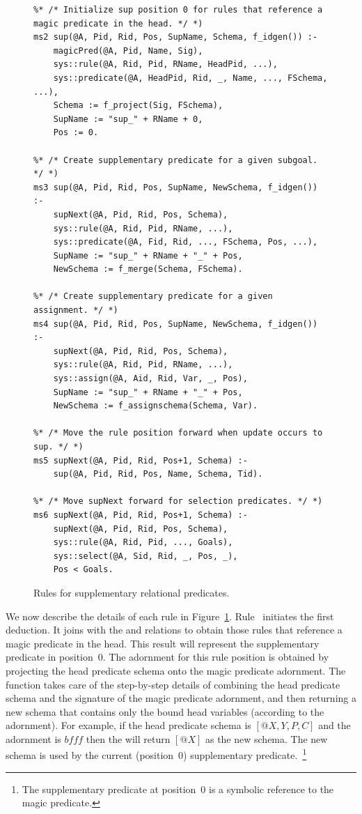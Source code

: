 \begin{figure}[!t]
\ssp
\centering
\begin{lstlisting}
%* /* Initialize sup position 0 for rules that reference a magic predicate in the head. */ *)
ms2 sup(@A, Pid, Rid, Pos, SupName, Schema, f_idgen()) :-
    magicPred(@A, Pid, Name, Sig),
    sys::rule(@A, Rid, Pid, RName, HeadPid, ...),
    sys::predicate(@A, HeadPid, Rid, _, Name, ..., FSchema, ...),
    Schema := f_project(Sig, FSchema),
    SupName := "sup_" + RName + 0,
    Pos := 0.

%* /* Create supplementary predicate for a given subgoal. */ *)
ms3 sup(@A, Pid, Rid, Pos, SupName, NewSchema, f_idgen()) :-
    supNext(@A, Pid, Rid, Pos, Schema),
    sys::rule(@A, Rid, Pid, RName, ...),
    sys::predicate(@A, Fid, Rid, ..., FSchema, Pos, ...),
    SupName := "sup_" + RName + "_" + Pos,
    NewSchema := f_merge(Schema, FSchema).
	
%* /* Create supplementary predicate for a given assignment. */ *)
ms4 sup(@A, Pid, Rid, Pos, SupName, NewSchema, f_idgen()) :-
    supNext(@A, Pid, Rid, Pos, Schema), 
    sys::rule(@A, Rid, Pid, RName, ...),
    sys::assign(@A, Aid, Rid, Var, _, Pos),
    SupName := "sup_" + RName + "_" + Pos,
    NewSchema := f_assignschema(Schema, Var).

%* /* Move the rule position forward when update occurs to sup. */ *)
ms5 supNext(@A, Pid, Rid, Pos+1, Schema) :-
    sup(@A, Pid, Rid, Pos, Name, Schema, Tid).
	
%* /* Move supNext forward for selection predicates. */ *)
ms6 supNext(@A, Pid, Rid, Pos+1, Schema) :-
    supNext(@A, Pid, Rid, Pos, Schema),
    sys::rule(@A, Rid, Pid, ..., Goals),
    sys::select(@A, Sid, Rid, _, Pos, _),
    Pos < Goals. 
\end{lstlisting}
\caption{\label{ch:magic:fig:magic2}Rules for supplementary relational predicates.}
\end{figure}

We now describe the details of each rule in Figure~\ref{ch:magic:fig:magic2}.
Rule~ initiates the first  deduction.  It joins 
with the  and  relations to obtain those rules that
reference a magic predicate in the head.  This result will represent the
supplementary predicate in position~$0$.  The adornment for this rule position
is obtained by projecting the head predicate schema onto the magic predicate
adornment.  The function  takes care of the step-by-step
details of combining the head predicate schema and the signature of the magic
predicate adornment, and then returning a new schema that contains only the bound
head variables (according to the adornment).  For example, if the head
predicate schema is $[@X, Y, P, C]$ and the adornment is $bfff$ then the  
will return $[@X]$ as the new schema.  The new schema is used by
the current (position~$0$) supplementary predicate.~\footnote{The supplementary
predicate at position~$0$ is a symbolic reference to the magic predicate.}

